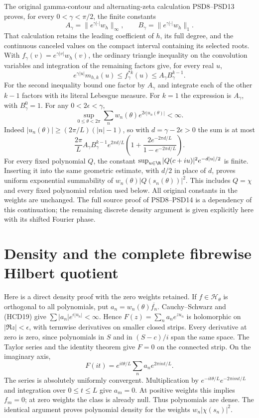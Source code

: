 The original gamma-contour and alternating-zeta calculation
PSD8--PSD13 proves, for every $0<\gamma<\pi/2$, the finite
constants
\[
 A_\gamma=\|e^{\gamma|\cdot|}w_h\|_\infty,\qquad
 B_\gamma=\|e^{\gamma|\cdot|}w_h\|_1.
\]
That calculation retains the leading coefficient of $h$,
its full degree, and the continuous canceled values on the
compact interval containing its selected roots. With
$f_\gamma(v)=e^{\gamma|v|}w_h(v)$, the ordinary triangle
inequality on the convolution variables and integration
of the remaining factors give, for every real $u$,
\[
 e^{\gamma|u|}m_{h,k}(u)
 \le f_\gamma^{*k}(u)
 \le A_\gamma B_\gamma^{k-1}.
 \tag{HCD19a}
\]
For the second inequality bound one factor by $A_\gamma$
and integrate each of the other $k-1$ factors with its
literal Lebesgue measure. For $k=1$ the expression is
$A_\gamma$, with $B_\gamma^0=1$.
For any $0<2\epsilon<\gamma$,
\[
 \sup_{0\le\theta<2\pi}
 \sum_nw_n(\theta)e^{2\epsilon|u_n(\theta)|}<\infty.
 \tag{HCD19}
\]
Indeed $|u_n(\theta)|\ge(2\pi/L)(|n|-1)$, so with
$d=\gamma-2\epsilon>0$ the sum is at most
\[
 \frac{2\pi}{L}A_\gamma B_\gamma^{k-1}
 e^{2\pi d/L}
 \left(1+\frac{2e^{-2\pi d/L}}{1-e^{-2\pi d/L}}\right).
\]
For every fixed polynomial $Q$, the constant
$\sup_{u\in\R}|Q(c+iu)|^2e^{-d|u|/2}$ is finite.
Inserting it into the same geometric estimate, with
$d/2$ in place of $d$, proves uniform exponential
summability of $w_n(\theta)|Q(s_n(\theta))|^2$.
This includes $Q=\chi$ and every fixed polynomial
relation used below. All original constants in the
weights are unchanged. The full source proof of
PSD8--PSD14 is a dependency of this continuation;
the remaining discrete density argument is given
explicitly here with its shifted Fourier phase.

\section{Density and the complete fibrewise Hilbert quotient}

Here is a direct density proof with the zero weights retained.
If $f\in\mathcal H_\theta$ is orthogonal to all polynomials,
put $a_n=w_n(\theta)\overline{f_n}$. Cauchy--Schwarz and
(HCD19) give $\sum|a_n|e^{\epsilon|u_n|}<\infty$.
Hence $F(z)=\sum_n a_ne^{zu_n}$ is holomorphic on
$|\Re z|<\epsilon$, with termwise derivatives on smaller
closed strips. Every derivative at zero is zero, since
polynomials in $S$ and in $(S-c)/i$ span the same space.
The Taylor series and the identity theorem give $F=0$
on the connected strip. On the imaginary axis,
\[
 F(it)=e^{it\theta/L}\sum_n a_ne^{2\pi int/L}.
\]
The series is absolutely uniformly convergent.
Multiplication by $e^{-it\theta/L}e^{-2\pi imt/L}$ and
integration over $0\le t\le L$ give $a_m=0$.
At positive weights this implies $f_m=0$; at zero weights
the class is already null. Thus polynomials are dense.
The identical argument proves polynomial density for
the weights $w_n|\chi(s_n)|^2$.

